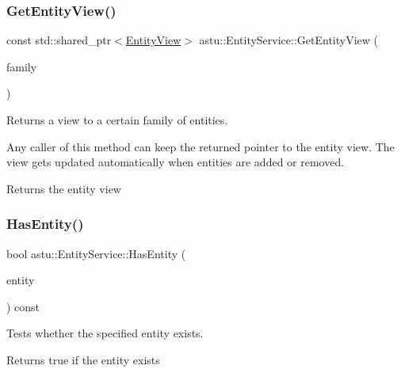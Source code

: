 \subsubsection{\texorpdfstring{Get\+Entity\+View()}{GetEntityView()}}
{\footnotesize\ttfamily const std\+::shared\+\_\+ptr$<$\hyperlink{group__ecs__group_gace2fb790b86c3908a65e4222f7ac2f4e}{Entity\+View}$>$ astu\+::\+Entity\+Service\+::\+Get\+Entity\+View (\begin{DoxyParamCaption}\item[{const \hyperlink{classastu_1_1EntityFamily}{Entity\+Family} \&}]{family }\end{DoxyParamCaption})}

Returns a view to a certain family of entities.

Any caller of this method can keep the returned pointer to the entity view. The view gets updated automatically when entities are added or removed.

\begin{DoxyReturn}{Returns}
the entity view 
\end{DoxyReturn}
\mbox{\label{classastu_1_1EntityService_a4a3c14fd7aa8edf4263913046744f277}} 
\subsubsection{\texorpdfstring{Has\+Entity()}{HasEntity()}}
{\footnotesize\ttfamily bool astu\+::\+Entity\+Service\+::\+Has\+Entity (\begin{DoxyParamCaption}\item[{std\+::shared\+\_\+ptr$<$ \hyperlink{classastu_1_1Entity}{Entity} $>$}]{entity }\end{DoxyParamCaption}) const}

Tests whether the specified entity exists.

\begin{DoxyReturn}{Returns}
{\ttfamily true} if the entity exists 
\end{DoxyReturn}
\mbox{\label{classastu_1_1EntityService_a57fa7f62f90b8ecf4513045d7be9f15c}} 
